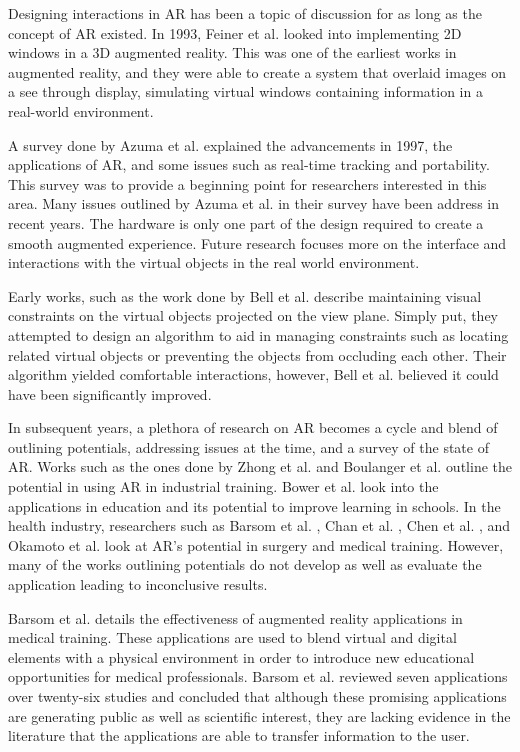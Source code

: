 Designing interactions in AR has been a topic of discussion for as long as the concept of AR existed. In 1993, Feiner et al. \cite{Feiner1993} looked into implementing 2D windows in a 3D augmented reality. This was one of the earliest works in augmented reality, and they were able to create a system that overlaid images on a see through display, simulating virtual windows containing information in a real-world environment.

A survey done by Azuma et al. \cite{Azuma1997} explained the advancements in 1997, the applications of AR, and some issues such as real-time tracking and portability. This survey was to provide a beginning point for researchers interested in this area. Many issues outlined by Azuma et al. in their survey have been address in recent years. The hardware is only one part of the design required to create a smooth augmented experience. Future research focuses more on the interface and interactions with the virtual objects in the real world environment.

Early works, such as the work done by Bell et al. \cite{Bell2001} describe maintaining visual constraints on the virtual objects projected on the view plane. Simply put, they attempted to design an algorithm to aid in managing constraints such as locating related virtual objects or preventing the objects from occluding each other. Their algorithm yielded comfortable interactions, however, Bell et al. believed it could have been significantly improved. 

In subsequent years, a plethora of research on AR becomes a cycle and blend of outlining potentials, addressing issues at the time, and a survey of the state of AR. Works such as the ones done by Zhong et al. \cite{Zhong2003} and Boulanger et al. \cite{Boulanger2004} outline the potential in using AR in industrial training. Bower et al. \cite{Bower2014} look into the applications in education and its potential to improve learning in schools. In the health industry, researchers such as Barsom et al. \cite{Barsom2016}, Chan et al. \cite{Chan2017}, Chen et al. \cite{Chen2015}, and Okamoto et al. \cite{Okamoto2015} look at AR's potential in surgery and medical training. However, many of the works outlining potentials do not develop as well as evaluate the application leading to inconclusive results.

Barsom et al. \cite{Barsom2016} details the effectiveness of augmented reality applications in medical training. These applications are used to blend virtual and digital elements with a physical environment in order to introduce new educational opportunities for medical professionals. Barsom et al. reviewed seven applications over twenty-six studies and concluded that although these promising applications are generating public as well as scientific interest, they are lacking evidence in the literature that the applications are able to transfer information to the user.

